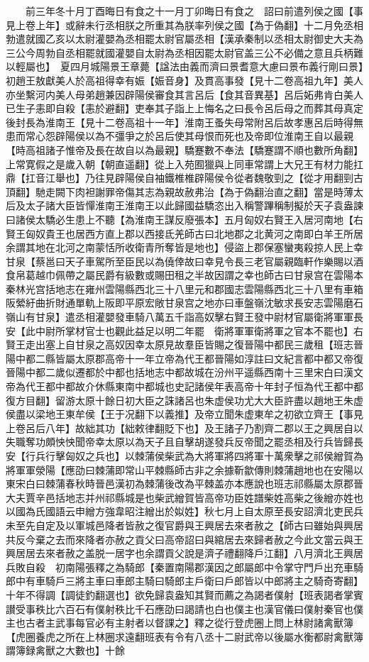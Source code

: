 　　前三年冬十月丁酉晦日有食之十一月丁卯晦日有食之　詔曰前遣列侯之國【事見上卷上年】或辭未行丞相朕之所重其為朕率列侯之國【為于偽翻】十二月免丞相勃遣就國乙亥以太尉灌嬰為丞相罷太尉官屬丞相【漢承秦制以丞相太尉御史大夫為三公今周勃自丞相罷就國灌嬰自太尉為丞相因罷太尉官盖三公不必備之意且兵柄難以輕屬也】　夏四月城陽景王章薨【諡法由義而濟曰景耆意大慮曰景布義行剛曰景】　初趙王敖獻美人於高祖得幸有娠【娠音身】及貫高事發【見十二卷高祖九年】美人亦坐繫河内美人母弟趙兼因辟陽侯審食其言呂后【食其音異基】呂后妬弗肯白美人已生子恚即自殺【恚於避翻】吏奉其子詣上上悔名之曰長令呂后母之而葬其母真定後封長為淮南王【見十二卷高祖十一年】淮南王蚤失母常附呂后故孝惠呂后時得無患而常心怨辟陽侯以為不彊爭之於呂后使其母恨而死也及帝即位淮南王自以最親【時高祖諸子惟帝及長在故自以為最親】驕蹇數不奉法【驕蹇謂不順也數所角翻】上常寛假之是歲入朝【朝直遥翻】從上入苑囿獵與上同車常謂上大兄王有材力能扛鼎【扛音江舉也】乃往見辟陽侯自袖鐵椎椎辟陽侯令從者魏敬剄之【從才用翻剄古頂翻】馳走闕下肉袒謝罪帝傷其志為親故赦弗治【為于偽翻治直之翻】當是時薄太后及太子諸大臣皆憚淮南王淮南王以此歸國益驕恣出入稱警蹕稱制擬於天子袁盎諫曰諸侯太驕必生患上不聽【為淮南王謀反廢張本】五月匈奴右賢王入居河南地【右賢王匈奴貴王也居西方直上郡以西接氐羌師古曰北地郡之北黄河之南即白羊王所居余謂其地在北河之南蒙恬所收衛青所奪皆是地也】侵盜上郡保塞蠻夷殺掠人民上幸甘泉【蔡邕曰天子車駕所至臣民以為僥倖故曰幸見令長三老官屬親臨軒作樂賜以酒食帛葛越巾佩帶之屬民爵有級數或賜田租之半故因謂之幸也師古曰甘泉宫在雲陽本秦林光宫括地志在雍州雲陽縣西北三十八里元和郡國志雲陽縣西北三十八里有車箱阪縈紆曲折財通單軌上阪即平原宏敞甘泉宫之地亦曰車盤嶺沈敏求長安志雲陽磨石嶺山有甘泉】遣丞相灌嬰發車騎八萬五千詣高奴擊右賢王發中尉材官屬衛將軍軍長安【此中尉所掌材官士也觀此益足以明二年罷　衛將軍軍衛將軍之官本不罷也】右賢王走出塞上自甘泉之高奴因幸太原見故羣臣皆賜之復晉陽中都民三歲租【班志晉陽中都二縣皆屬太原郡高帝十一年立帝為代王都晉陽如淳註曰文紀言都中都又帝復晉陽中都二歲似遷都於中都也括地志中都故城在汾州平遥縣西南十三里宋白曰漢文帝為代王都中都故介休縣東南中都城也史記諸侯年表高帝十年封子恒為代王都中都復方目翻】留游太原十餘日初大臣之誅諸呂也朱虚侯功尤大大臣許盡以趙地王朱虚侯盡以梁地王東牟侯【王于况翻下以義推】及帝立聞朱虚東牟之初欲立齊王【事見上卷呂后八年】故絀其功【絀敕律翻貶下也】及王諸子乃割齊二郡以王之興居自以失職奪功頗怏怏聞帝幸太原以為天子且自擊胡遂發兵反帝聞之罷丞相及行兵皆歸長安【行兵行擊匈奴之兵也】以棘蒲侯柴武為大將軍將四將軍十萬衆擊之祁侯繒賀為將軍軍滎陽【應劭曰棘蒲即常山平棘縣師古非之余據靳歙傳則棘蒲趙地也在安陽以東宋白曰棘蒲春秋時晉邑漢初為棘蒲後改為平棘盖亦本應說也班志祁縣屬太原郡晉大夫賈辛邑括地志并州祁縣城是也柴武繒賀皆高帝功臣姓譜柴姓高柴之後繒亦姓也以國為氏國語云申繒方強韋昭注繒出於姒姓】秋七月上自太原至長安詔濟北吏民兵未至先自定及以軍城邑降者皆赦之復官爵與王興居去來者赦之【師古曰雖始與興居共反今棄之去而來降者亦赦之貢父曰高帝詔曰與綰居去來歸者赦之今此文當云與王興居居去來者赦之盖脱一居字也余謂貢父說是濟子禮翻降戶江翻】八月濟北王興居兵敗自殺　初南陽張釋之為騎郎【秦置南陽郡漢因之郎屬郎中令掌守門戶出充車騎郎中有車騎戶三將主車曰車郎主騎曰騎郎主戶衛曰戶郎皆以中郎將主之騎奇寄翻】十年不得調【調徒釣翻選也】欲免歸袁盎知其賢而薦之為謁者僕射【班表謁者掌賓讃受事秩比六百石有僕射秩比千石應劭曰謁請也白也僕主也漢官儀曰僕射秦官也僕主也古者主武事每官必有主射者以督課之】釋之從行登虎圈上問上林尉諸禽獸簿【虎圈養虎之所在上林圈求遠翻班表有令有八丞十二尉武帝以後屬水衡都尉禽獸簿謂簿録禽獸之大數也】十餘